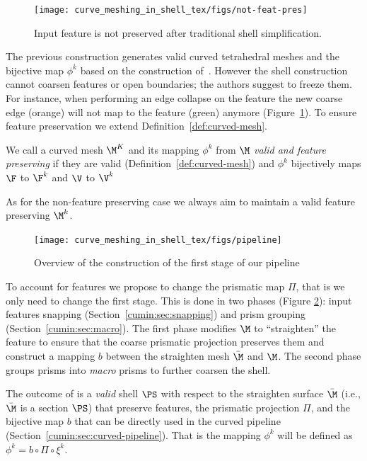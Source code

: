 \begin{figure}
    \centering
    \texttt{[image: curve\_meshing\_in\_shell\_tex/figs/not-feat-pres]}
    \caption{Input feature is not preserved after traditional shell simplification.}
    \label{bichon:fig:not-feat-pres}
\end{figure}

The previous construction generates valid curved tetrahedral meshes and the bijective map $\phi^k$ based on the construction of~\cite{jiang2020bijective}. However the shell construction cannot coarsen features or open boundaries; the authors suggest to freeze them. For instance, when performing an edge collapse on the feature the new coarse edge (orange) will not map to the feature (green) anymore (Figure~\ref{bichon:fig:not-feat-pres}). 
To ensure feature preservation we extend Definition~\ref{def:curved-mesh}.
\begin{definition}\label{def:curved-features}
We call a curved mesh $\M^K$ and its mapping $\phi^k$ from $\M$ \emph{valid and feature preserving} if they are valid (Definition~\ref{def:curved-mesh}) and $\phi^k$ bijectively maps $\F$ to $\F^k$ and $\V$ to $\V^k$
\end{definition}
As for the non-feature preserving case we always aim to maintain a valid feature preserving $\M^k$.


\begin{figure}
    \centering
    \texttt{[image: curve\_meshing\_in\_shell\_tex/figs/pipeline]}
    \caption{Overview of the construction of the first stage of our pipeline}
    \label{bichon:fig:stage-1}
\end{figure}

To account for features we propose to change the prismatic map $\Pi$, that is we only need to change the first stage. This is done in two phases (Figure \ref{bichon:fig:stage-1}): input features snapping (Section~\ref{cumin:sec:snapping}) and prism grouping (Section~\ref{cumin:sec:macro}). The first phase modifies $\M$ to ``straighten'' the feature to ensure that the coarse prismatic projection preserves them and construct a mapping $b$ between the straighten mesh $\bar\M$ and $\M$. The second phase groups prisms into \emph{macro} prisms to further coarsen the shell.

The outcome of is a \emph{valid} shell $\PS$ with respect to the straighten surface $\bar\M$ (i.e., $\bar\M$ is a section $\PS$) that preserve features, the prismatic projection $\Pi$, and the bijective map $b$ that can be directly used in the curved pipeline (Section~\ref{cumin:sec:curved-pipeline}). That is the mapping  $\phi^k$ will be defined as $\phi^k = b \circ \Pi \circ \xi^k$.


